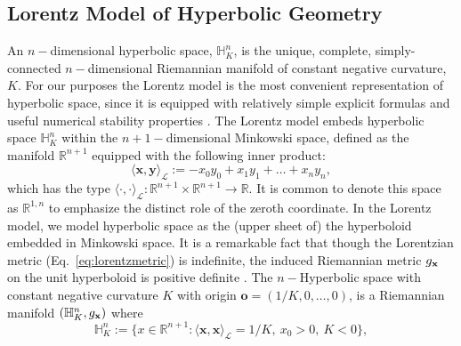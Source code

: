 \subsection{Lorentz Model of Hyperbolic Geometry}
An $n-$dimensional hyperbolic space, $\mathbb{H}^n_K$, is the unique, complete, simply-connected $n-$dimensional Riemannian manifold of constant negative curvature, $K$.  For our purposes the Lorentz model is the most convenient representation of hyperbolic space, since it is equipped with relatively simple explicit formulas and useful numerical stability properties \cite{nickel2018learning}. The Lorentz model embeds hyperbolic space $\mathbb{H}^n_K$ within the $n+1-$dimensional Minkowski space, defined as the manifold $\mathbb{R}^{n+1}$ equipped with the following inner product:
\begin{equation}\label{eq:lorentzmetric}
    \langle \textbf{x}, \textbf{y} \rangle_{\mathcal{L}} := -x_0y_0 + x_1y_1 + \dots + x_ny_n,
\end{equation}
which has the type 
$\langle \cdot, \cdot \rangle_{\mathcal{L}}: \mathbb{R}^{n+1} \times \mathbb{R}^{n+1} \to \mathbb{R}$.
It is common to denote this space as $\mathbb{R}^{1,n}$ to emphasize the distinct role of the zeroth coordinate.
In the Lorentz model, we model hyperbolic space as the (upper sheet of) the hyperboloid embedded in Minkowski space. It is a remarkable fact that though the Lorentzian metric (Eq.~\ref{eq:lorentzmetric}) is indefinite,
the induced Riemannian metric $g_{\mathbf{x}}$ on the unit hyperboloid is positive definite \cite{Ratcliffe94}. The $n-$Hyperbolic space with constant negative curvature $K$ with origin $\textbf{o} = (1/K, 0, \dots, 0)$, is a Riemannian manifold $(\mathbb{H}^{n}_K,g_{\mathbf{x}})$ where
\begin{equation*}
    \mathbb{H}^{n}_K := \{x \in \mathbb{R}^{n+1}:  \langle \textbf{x}, \textbf{x} \rangle_{\mathcal{L}} = 1/K, \ x_0 > 0, \ K<0 \},
\end{equation*}


